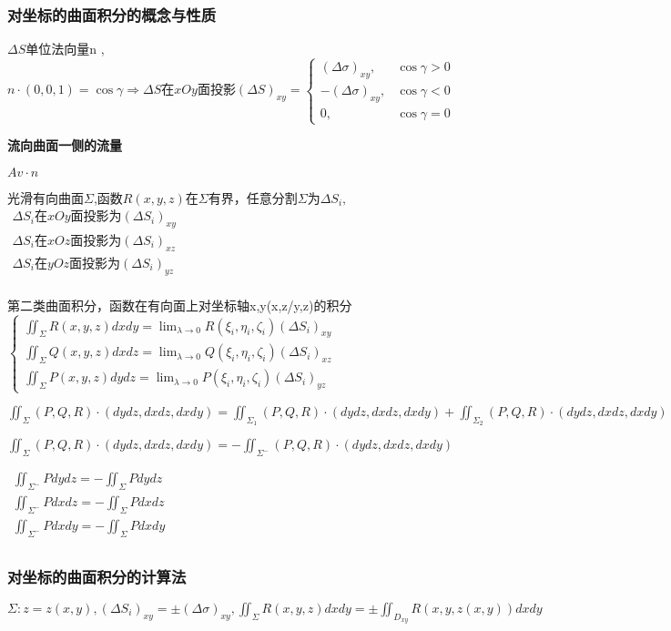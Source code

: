 \documentclass[UTF8]{ctexart}
\newcommand{\mt}[1]{\text{#1}}
\newcommand{\mb}[1]{\textbf{#1}}
\newcommand{\mf}[1]{\left( #1\right)}
\newcommand{\p}{\par}
\newcommand{\ma}[1]{\begin{array}{llll} #1 \end{array}}
\newcommand{\fcz}[1] {
    \left\{
        \begin{array}{llll} #1 \end{array}
    \right.
}
\begin{document}
\subsubsection{对坐标的曲面积分的概念与性质}

$\Delta S$单位法向量n ,$n \cdot \mf{0,0,1}=\cos \gamma \Rightarrow \Delta S \mt{在}xOy\mt{面投影}\mf{\Delta S}_{xy}=\fcz{  
    \mf{ \Delta \sigma}_{xy},&\cos \gamma>0\\
    -\mf{ \Delta \sigma}_{xy},&\cos \gamma<0\\
    0,&\cos \gamma=0
}$


\mb{流向曲面一侧的流量}\p
$Av\cdot n$

光滑有向曲面$\Sigma$,函数$R\mf{x,y,z}$在$\Sigma$有界，任意分割$\Sigma$为$\Delta S_i,$
$\ma{
\Delta S_i\mt{在}xOy\mt{面投影为}\mf{\Delta S_i}_{xy}\\ %
\Delta S_i\mt{在}xOz\mt{面投影为}\mf{\Delta S_i}_{xz}\\ %
\Delta S_i\mt{在}yOz\mt{面投影为}\mf{\Delta S_i}_{yz}\\ %
}$

第二类曲面积分，函数在有向面上对坐标轴x,y(x,z/y,z)的积分$\fcz{
    \iint_\Sigma R\mf{x,y,z}dxdy=\lim_{\lambda \rightarrow 0}R\mf{\xi_i,\eta_i,\zeta_i}\mf{\Delta S_i}_{xy}\\
    \iint_\Sigma Q\mf{x,y,z}dxdz=\lim_{\lambda \rightarrow 0}Q\mf{\xi_i,\eta_i,\zeta_i}\mf{\Delta S_i}_{xz}\\
    \iint_\Sigma P\mf{x,y,z}dydz=\lim_{\lambda \rightarrow 0}P\mf{\xi_i,\eta_i,\zeta_i}\mf{\Delta S_i}_{yz}
}$

$\iint_\Sigma \mf{P,Q,R}\cdot \mf{dydz,dxdz,dxdy}=\iint_{\Sigma_1} \mf{P,Q,R}\cdot \mf{dydz,dxdz,dxdy}+\iint_{\Sigma_2} \mf{P,Q,R}\cdot \mf{dydz,dxdz,dxdy}$

$\iint_\Sigma \mf{P,Q,R}\cdot \mf{dydz,dxdz,dxdy}=-\iint_{\Sigma^-} \mf{P,Q,R}\cdot \mf{dydz,dxdz,dxdy}$

$\ma{
    \iint_{\Sigma^-}Pdydz=-\iint_{\Sigma}Pdydz\\
    \iint_{\Sigma^-}Pdxdz=-\iint_{\Sigma}Pdxdz\\
    \iint_{\Sigma^-}Pdxdy=-\iint_{\Sigma}Pdxdy\\
}$


\subsubsection{对坐标的曲面积分的计算法}
$\Sigma : z=z\mf{x,y},\mf{\Delta S_i}_{xy}=\pm\mf{\Delta \sigma}_{xy},\iint_\Sigma R\mf{x,y,z}dxdy=\pm \iint_{D_{xy}}R\mf{x,y,z\mf{x,y}}dxdy$
\end{document}
